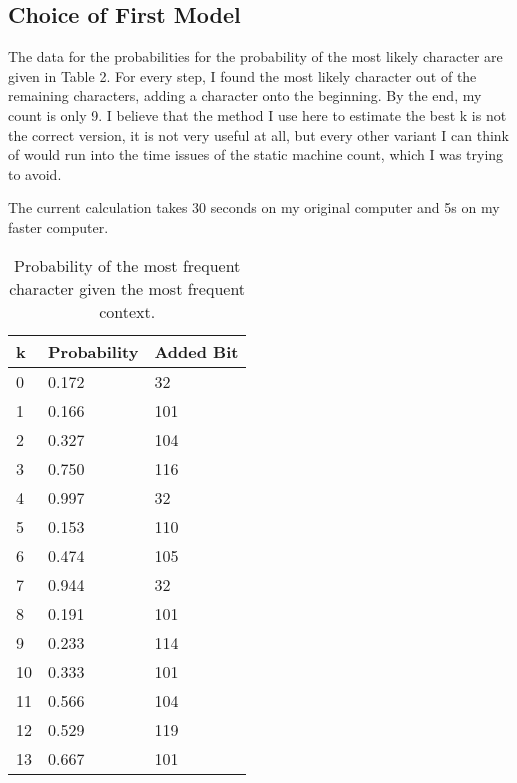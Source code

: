 \documentclass{article}
\begin{document}
\subsection{Choice of First Model}

The data for the probabilities for the probability of the most likely character are given in Table 2. For every step, I found the most likely character out of the remaining characters, adding a character onto the beginning. By the end, my count is only 9.
I believe that the method I use here to estimate the best k is not the correct version, it is not very useful at all, but every other variant I can think of would run into the time issues of the static machine count, which I was trying to avoid.

The current calculation takes 30 seconds on my original computer and 5s on my faster computer.

\begin{table}[]
\caption{Probability of the most frequent character given the most frequent context.}
\label{probs}
\begin{center}

\begin{tabular}{|l|l|l|}
\hline
k  & Probability & Added Bit \\ \hline
0  & 0.172       & 32        \\ \hline
1  & 0.166       & 101       \\ \hline
2  & 0.327       & 104       \\ \hline
3  & 0.750       & 116       \\ \hline
4  & 0.997       & 32        \\ \hline
5  & 0.153       & 110       \\ \hline
6  & 0.474       & 105       \\ \hline
7  & 0.944       & 32        \\ \hline
8  & 0.191       & 101       \\ \hline
9  & 0.233       & 114       \\ \hline
10 & 0.333       & 101       \\ \hline
11 & 0.566       & 104       \\ \hline
12 & 0.529       & 119       \\ \hline
13 & 0.667       & 101       \\ \hline
\end{tabular}
\end{center}

\end{table}
\end{document}
